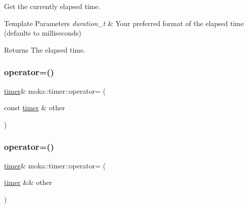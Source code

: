 Get the currently elapsed time. 


\begin{DoxyTemplParams}{Template Parameters}
{\em duration\+\_\+t} & Your preferred format of the elapsed time (defaults to milliseconds) \\
\hline
\end{DoxyTemplParams}
\begin{DoxyReturn}{Returns}
The elapsed time. 
\end{DoxyReturn}
\mbox{\label{classmoka_1_1timer_a9afec3a2d5cda9c48b1fad91441ff547}} 
\subsubsection{\texorpdfstring{operator=()}{operator=()}\hspace{0.1cm}{\footnotesize\ttfamily [1/2]}}
{\footnotesize\ttfamily \mbox{\hyperlink{classmoka_1_1timer}{timer}}\& moka\+::timer\+::operator= (\begin{DoxyParamCaption}\item[{const \mbox{\hyperlink{classmoka_1_1timer}{timer}} \&}]{other }\end{DoxyParamCaption})\hspace{0.3cm}{\ttfamily [default]}}

\mbox{\label{classmoka_1_1timer_ab301e83e7655cfbb816d958570307807}} 
\subsubsection{\texorpdfstring{operator=()}{operator=()}\hspace{0.1cm}{\footnotesize\ttfamily [2/2]}}
{\footnotesize\ttfamily \mbox{\hyperlink{classmoka_1_1timer}{timer}}\& moka\+::timer\+::operator= (\begin{DoxyParamCaption}\item[{\mbox{\hyperlink{classmoka_1_1timer}{timer}} \&\&}]{other }\end{DoxyParamCaption})\hspace{0.3cm}{\ttfamily [default]}}

\mbox{\label{classmoka_1_1timer_a3690eb93f4f91c1650f9fd3589c3adb9}} 
